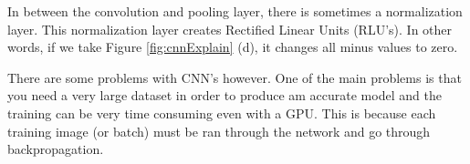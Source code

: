 In between the convolution and pooling layer, there is sometimes a normalization
layer. This normalization layer creates Rectified Linear Units (RLU's). In other
words, if we take Figure \ref{fig:cnnExplain} (d), it changes all minus values to
zero.

There are some problems with CNN's however. One of the main problems is that you
need a very large dataset in order to produce am accurate model and the training
can be very time consuming even with a GPU.
This is because each training image (or batch) must be ran through the network and go through backpropagation.